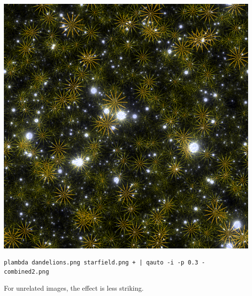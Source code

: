 \includegraphics{combined2.png}
\begin{verbatim}
plambda dandelions.png starfield.png + | qauto -i -p 0.3 - combined2.png
\end{verbatim}
For unrelated images, the effect is less striking.










